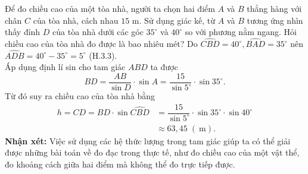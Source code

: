 \begin{bt}%
	Để đo chiều cao của một tòa nhà, người ta chọn hai điểm $A$ và $B$ thẳng hàng với chân $C$ của tòa nhà, cách nhau $15$ m. Sử dụng giác kế, từ $A$ và $B$ tương ứng nhìn thấy đỉnh $D$ của tòa nhà dưới các góc $35^\circ$ và $40^\circ$ so với phương nằm ngang. Hỏi chiều cao của tòa nhà đo được là bao nhiêu mét?
	\loigiai
	{
	Do $\widehat{CBD}=40^\circ, \widehat{BAD}=35^\circ$ nên $\widehat{ADB}=40^\circ-35^\circ=5^\circ$ (H.3.3). \\
	Áp dụng định lí sin cho tam giác $ABD$ ta được 
	$$BD=\dfrac{AB}{\sin D}\cdot\sin A=\dfrac{15}{\sin 5^\circ}\cdot\sin 35^\circ.$$
	Từ đó suy ra chiều cao của tòa nhà bằng
	$$
	\begin{aligned}
	h=CD=BD\cdot\sin\widehat{CBD}&=\dfrac{15}{\sin 5^\circ}\cdot\sin 35^\circ\cdot\sin 40^\circ\\
	&\approx 63{,}45 \;(\mathrm{~m}).
	\end{aligned}$$
	\textbf{Nhận xét:}
	Việc sử dụng các hệ thức lượng trong tam giác giúp ta có thể giải được những bài toán về đo đạc trong thực tế, như đo chiều cao của một vật thể, đo khoảng cách giữa hai điểm mà không thể đo trực tiếp được.	
	}
\end{bt}

